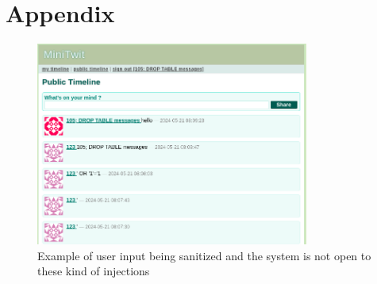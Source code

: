 \documentclass[11pt]{article}
\begin{document}




\newpage
 


\newpage

% 


\section{Appendix}
\begin{figure}[!h]
    \centering
    \includegraphics[width=0.8\textwidth]{images/sql_injections.png}
    \caption{Example of user input being sanitized and the system is not open to these kind of injections}
    \label{fig:sqlinjections}
\end{figure}
\end{document}

